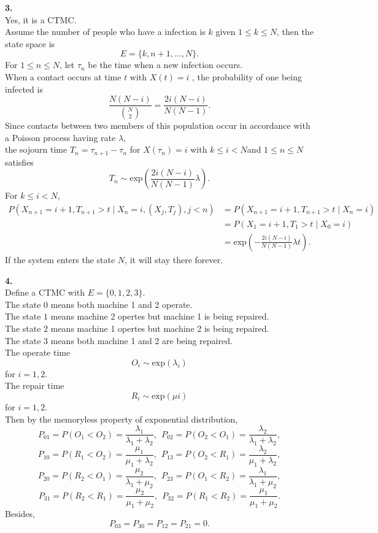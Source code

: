 \documentclass{amsart}
\theoremstyle{plain}
\theoremstyle{definition}
\begin{document}
\newpage

\noindent \textbf{3.}\\
Yes, it is a CTMC.\\
Assume the number of people who have a infection is $k$ given $1 \leq k \leq N$, then the state space is  
\[E = \{k, n+1,...,N\}.\]
For $1 \leq n \leq N$, let $\tau_n$ be the time when a new infection occurs.\\ 
When a contact occurs at time $t$ with $X(t) = i$ , the probability of one being infected is 
\[\frac{N(N-i)}{{N \choose 2}} = \frac{2i(N-i)}{N(N-1)}.\]  
Since contacts between two members of this population occur in accordance
with a Poisson process having rate $\lambda$,\\
the sojourn time $T_{n} = \tau_{n+1} - \tau_n$ for $X(\tau_n) = i$ with $k \leq i < N $and $1\leq n \leq N$ satisfies 
\[T_n \sim \text{exp}\left(\frac{2i(N-i)}{N(N-1)} \lambda \right).\]
For $k \leq i < N$, 
\begin{align*}
  P(X_{n+1} = i + 1, T_{n+1} > t \mid X_n = i, (X_j, T_j), j <n) &= P(X_{n+1} = i + 1, T_{n+1} > t \mid X_n = i) \\
  &= P(X_{1} = i + 1, T_{1} > t \mid X_0 = i) \\
  &= \text{exp}\left(-\frac{2i(N-i)}{N(N-1)} \lambda t\right).
\end{align*}
If the system enters the state $N$, it will stay there forever.

\newpage

\noindent \textbf{4.}\\
Define a CTMC with $E = \{0,1,2,3\}$.\\
The state $0$ means both machine 1 and 2 operate.\\
The state $1$ means machine 2 opertes but machine 1 is being repaired.\\
The state $2$ means machine 1 opertes but machine 2 is being repaired.\\
The state $3$ means both machine 1 and 2 are being repaired.\\
The operate time 
\[ O_i \sim \text{exp}(\lambda_i)\]  
for $i = 1,2$. \\
The repair time 
\[R_i \sim \text{exp}(\mu i)\]
for $i= 1,2$.\\
Then by the memoryless property of exponential distribution,
\[P_{01} = P(O_1 < O_2) = \frac{\lambda_1}{\lambda_1 + \lambda_2},\ \ 
P_{02} = P(O_2 < O_1) = \frac{\lambda_2}{\lambda_1 + \lambda_2},\]
\[P_{10} = P(R_1 < O_2) = \frac{\mu_1}{\mu_1 + \lambda_2},\ \ 
P_{13} = P(O_2 < R_1) = \frac{\lambda_2}{\mu_1 + \lambda_2},\]
\[P_{20} = P(R_2 < O_1) = \frac{\mu_2}{\lambda_1 + \mu_2}, \ \
P_{23} = P(O_1 < R_2) = \frac{\lambda_1}{\lambda_1 + \mu_2},\] 
\[P_{31} = P(R_2 < R_1) = \frac{\mu_2}{\mu_1+ \mu_2},\ \
P_{32} = P(R_1 < R_2) = \frac{\mu_1}{\mu_1+ \mu_2}.\]
Besides,
\[P_{03} = P_{30} = P_{12} = P_{21} = 0.\]
\renewcommand{\kbldelim}{(}%
\renewcommand{\kbrdelim}{)}%
\end{document}
